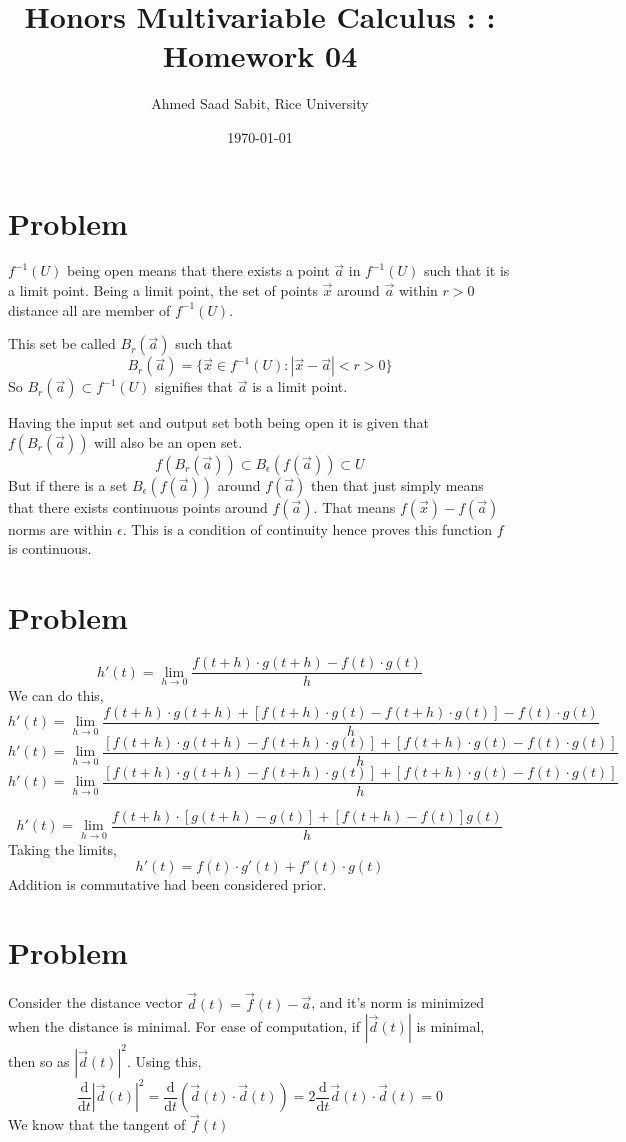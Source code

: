 \documentclass[letter]{article}
\title{Honors Multivariable Calculus : : Homework 04}
\author{Ahmed Saad Sabit, Rice University}
\date{\today}
\begin{document}
\maketitle
\section{Problem}

$f^{-1}(U) $ being open means that there exists a point $\vec{a}$ in $f^{-1}(U)$ such that it is a limit point. Being a limit point, the set of points $\vec{x}$ around $\vec{a}$ within $r>0$ distance all are member of $f^{-1}(U)$.

This set be called $B_r(\vec{a})$ such that
\[
B_r(\vec{a}) = \{\vec{x} \in f^{-1}(U) : |\vec{x}-\vec{a}| < r > 0\} 
\]
So $B_r(\vec{a}) \subset f^{-1}(U)$ signifies that $\vec{a}$ is a limit point. 

Having the input set and output set both being open it is given that $f(B_r(\vec{a}))$ will also be an open set. 
\[
f(B_r(\vec{a}) ) \subset B_\epsilon(f(\vec{a})) \subset U
\]
But if there is a set $B_\epsilon (f(\vec{a}))$ around $f(\vec{a})$ then that just simply means that there exists continuous points around $f(\vec{a})$. That means $f(\vec{x}) - f(\vec{a})$ norms are within $\epsilon$. This is a condition of continuity hence proves this function $f$ is continuous. 

\section{Problem} 

\[
h'(t) = \lim_{h \to 0} \frac{f(t+h)\cdot g(t+h) - f(t) \cdot g(t)}{h}
\]
We can do this, 
\[
	h'(t) = \lim_{h \to 0} \frac{f(t+h)\cdot g(t+h) +[f(t+h) \cdot g(t) - f(t+h) \cdot g(t)]- f(t) \cdot g(t)}{h}
\]
\[
	h'(t) = \lim_{h \to 0} \frac{[f(t+h)\cdot g(t+h) - f(t+h) \cdot g(t) ] + [f(t+h) \cdot g(t)- f(t) \cdot g(t)]}{h}
\]
\[
	h'(t) = \lim_{h \to 0} \frac{[f(t+h)\cdot g(t+h) - f(t+h) \cdot g(t) ]  +[f(t+h) \cdot g(t)- f(t) \cdot g(t)]}{h}
\]

\[
	h'(t) = \lim_{h \to 0} \frac{f(t+h)\cdot [g(t+h) -   g(t) ]  +[f(t+h) -f(t) ] g(t)}{h}
\]
Taking the limits, 
\[
h'(t) = f(t) \cdot g'(t) + f'(t) \cdot g(t)
\]
Addition is commutative had been considered prior. 

\section{Problem}
Consider the distance vector $\vec{d}(t) = \vec{f}(t) - \vec{a}$, and it's norm is minimized when the distance is minimal. For ease of computation, if $|\vec{d}(t)| $ is minimal, then so as $|\vec{d}(t)|^2$. Using this,
\[
\frac{\mathrm{d} }{\mathrm{d} t} |\vec{d}(t)|^2 = \frac{\mathrm{d} }{\mathrm{d}t } \left( \vec{d}(t) \cdot \vec{d}(t)\right) = 2 \frac{\mathrm{d} }{\mathrm{d} t}\vec{d}(t) \cdot \vec{d}(t) = 0
\]
We know that the tangent of $\vec{f}(t) $
\end{document}
